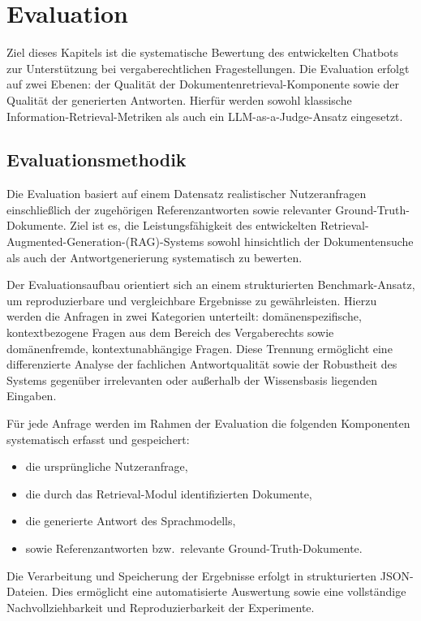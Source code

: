 \section{Evaluation}
\label{sec:Evaluation}

Ziel dieses Kapitels ist die systematische Bewertung des entwickelten Chatbots zur Unterstützung bei vergaberechtlichen Fragestellungen. Die Evaluation erfolgt auf zwei Ebenen: der Qualität der Dokumentenretrieval-Komponente sowie der Qualität der generierten Antworten. Hierfür werden sowohl klassische Information-Retrieval-Metriken als auch ein LLM-as-a-Judge-Ansatz eingesetzt.

\subsection{Evaluationsmethodik}

Die Evaluation basiert auf einem Datensatz realistischer Nutzeranfragen einschließlich der zugehörigen Referenzantworten sowie relevanter Ground-Truth-Dokumente. Ziel ist es, die Leistungsfähigkeit des entwickelten Retrieval-Augmented-Generation-(RAG)-Systems sowohl hinsichtlich der Dokumentensuche als auch der Antwortgenerierung systematisch zu bewerten.

Der Evaluationsaufbau orientiert sich an einem strukturierten Benchmark-Ansatz, um reproduzierbare und vergleichbare Ergebnisse zu gewährleisten. Hierzu werden die Anfragen in zwei Kategorien unterteilt: domänenspezifische, kontextbezogene Fragen aus dem Bereich des Vergaberechts sowie domänenfremde, kontextunabhängige Fragen. Diese Trennung ermöglicht eine differenzierte Analyse der fachlichen Antwortqualität sowie der Robustheit des Systems gegenüber irrelevanten oder außerhalb der Wissensbasis liegenden Eingaben.

Für jede Anfrage werden im Rahmen der Evaluation die folgenden Komponenten systematisch erfasst und gespeichert:
\begin{itemize}
    \item die ursprüngliche Nutzeranfrage,
    \item die durch das Retrieval-Modul identifizierten Dokumente,
    \item die generierte Antwort des Sprachmodells,
    \item sowie Referenzantworten bzw.\ relevante Ground-Truth-Dokumente.
\end{itemize}

Die Verarbeitung und Speicherung der Ergebnisse erfolgt in strukturierten JSON-Dateien. Dies ermöglicht eine automatisierte Auswertung sowie eine vollständige Nachvollziehbarkeit und Reproduzierbarkeit der Experimente.

